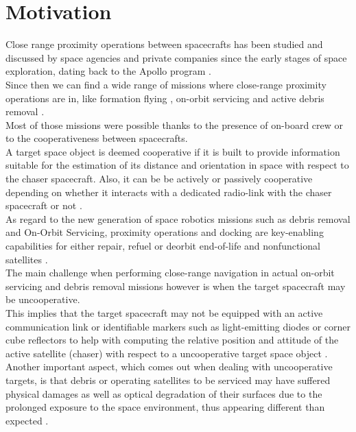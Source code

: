 \section{Motivation}
Close range proximity operations between spacecrafts has been studied and discussed by space agencies and private companies since the early stages of space exploration, dating back to the Apollo program \cite{LangleyApollo}.\\
Since then we can find a wide range of missions where close-range proximity operations are in, like formation flying \cite{2001FormationFliying}  \cite{2009FormationFliying}, on-orbit servicing \cite{Zimpfer2005} \cite{Tatsch2006} \cite{FloresAbad2014} and active debris removal \cite{clerc2012astrium} \cite{Bonnal2013}.\\
Most of those missions were possible thanks to the presence of on-board crew or to the cooperativeness between spacecrafts.\\
A target space object is deemed cooperative if it is built to provide information suitable for the estimation of its distance and orientation in space with respect to the chaser spacecraft. Also, it can be be actively or passively cooperative depending on whether it interacts with a dedicated radio-link with the chaser spacecraft or not \cite{Opromolla2017}.\\
As regard to the new generation of space robotics missions such as debris removal and On-Orbit Servicing, proximity operations and docking are key-enabling capabilities for either repair, refuel or deorbit end-of-life and nonfunctional satellites \cite{2016Ventura}.\\
The main challenge when performing close-range navigation in actual on-orbit servicing and debris removal missions however is when the target spacecraft may be uncooperative.\\
This implies that the target spacecraft may not be equipped with an active communication link or identifiable markers such as light-emitting diodes or corner cube reflectors to help with computing the relative position and attitude of the active satellite (chaser) with respect to a uncooperative target space object \cite{2019phdSharma}.\\
Another important aspect, which comes out when dealing with uncooperative targets, is that debris or operating satellites to be serviced may have suffered physical damages as well as optical degradation of their surfaces due to the prolonged exposure to the space environment, thus appearing different than expected \cite{Opromolla2017}.\\
